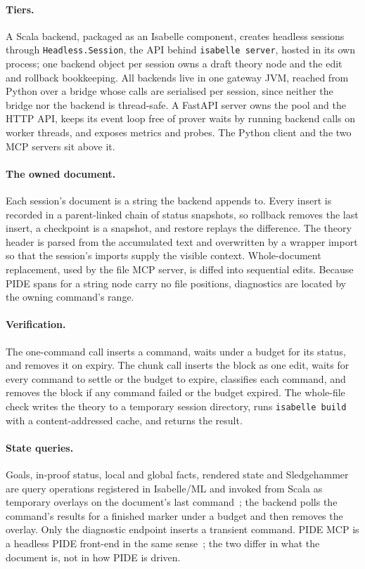 \documentclass[11pt]{article}
\newcommand{\code}[1]{\colorbox{gray!12}{\texttt{\vphantom{Ag}#1}}}
\begin{document}
\paragraph{Tiers.} A Scala backend, packaged as an Isabelle component,
creates headless sessions through \code{Headless.Session}, the API
behind \code{isabelle server}, hosted in its own process; one backend object per session owns a draft theory node
and the edit and rollback bookkeeping. All backends live in one gateway
JVM, reached from Python over a bridge whose calls are serialised per
session, since neither the bridge nor the backend is thread-safe. A
FastAPI server owns the pool and the HTTP API, keeps its event loop free of
prover waits by running backend calls on worker threads, and exposes
metrics and probes. The Python client and the two MCP servers sit above
it.

\paragraph{The owned document.} Each session's document is a string the
backend appends to. Every insert is recorded in a parent-linked chain of
status snapshots, so rollback removes the last insert, a checkpoint is a
snapshot, and restore replays the difference. The theory header is parsed
from the accumulated text and overwritten by a wrapper import so that the
session's imports supply the visible context. Whole-document replacement,
used by the file MCP server, is diffed into sequential edits. Because PIDE
spans for a string node carry no file positions, diagnostics are located
by the owning command's range.

\paragraph{Verification.} The one-command call inserts a command, waits
under a budget for its status, and removes it on expiry. The chunk call
inserts the block as one edit, waits for every command to settle or the
budget to expire, classifies each command, and removes the block if any
command failed or the budget expired. The whole-file check writes the
theory to a temporary session directory, runs \code{isabelle build} with
a content-addressed cache, and returns the result.

\paragraph{State queries.} Goals, in-proof status, local and global
facts, rendered state and Sledgehammer are query operations registered in
Isabelle/ML and invoked from Scala as temporary overlays on the
document's last command~\cite{wenzel2014pide}; the backend polls the
command's results for a finished marker under a budget and then removes
the overlay. Only the diagnostic endpoint inserts a transient command.
PIDE MCP is a headless PIDE front-end in the same sense~\cite{wenzel2019pide};
the two differ in what the document is, not in how PIDE is driven.
\end{document}

